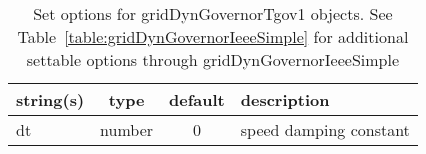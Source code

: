 \begin{table}[ht]
\centering
\begin{tabular}{p{5cm} c c p{7cm}}
\hline
string(s) & type & default & description \\
\hline
dt & number & 0 & speed damping constant\\
\hline
\end{tabular}
\caption{Set options for gridDynGovernorTgov1 objects. See Table~\ref{table:gridDynGovernorIeeeSimple} for additional settable options through gridDynGovernorIeeeSimple}
\label{table:gridDynGovernorTgov1}
\end{table}
